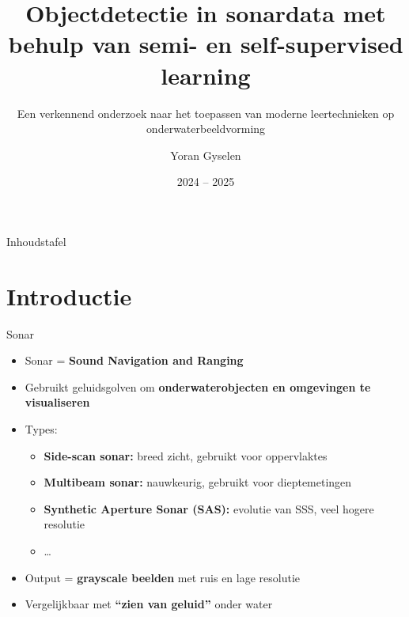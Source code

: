 \documentclass[aspectratio=169]{beamer}
\title{Objectdetectie in sonardata met behulp van semi- en self-supervised learning}
\subtitle{Een verkennend onderzoek naar het toepassen van moderne leertechnieken op onderwaterbeeldvorming}
\author{Yoran Gyselen}
\institute[HOGENT]{Hogeschool Gent}
\date{2024 -- 2025}
\begin{document}
    
    \begin{frame}{}
        \titlepage
    \end{frame}
    
    \begin{frame}{Inhoudstafel}
        \tableofcontents
    \end{frame}
    
    \section{Introductie}
    
    \begin{frame}{Sonar}
        \begin{itemize}
            \item Sonar = \textbf{Sound Navigation and Ranging}
            \item Gebruikt geluidsgolven om \textbf{onderwaterobjecten en omgevingen te visualiseren}
            \item Types:
            \begin{itemize}
                \item \textbf{Side-scan sonar:} breed zicht, gebruikt voor oppervlaktes
                \item \textbf{Multibeam sonar:} nauwkeurig, gebruikt voor dieptemetingen
                \item \textbf{Synthetic Aperture Sonar (SAS):} evolutie van SSS, veel hogere resolutie
                \item \dots
            \end{itemize}
            \item Output = \textbf{grayscale beelden} met ruis en lage resolutie
            \item Vergelijkbaar met \textbf{``zien van geluid''} onder water
        \end{itemize}
    \end{frame}
    
\end{document}
